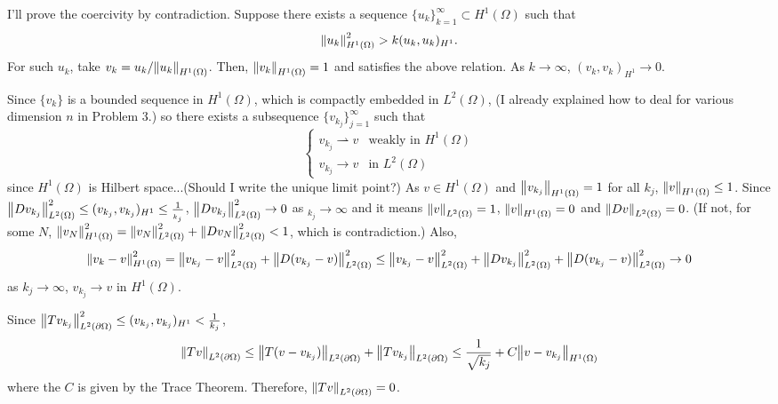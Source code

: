 \documentclass{article}
\begin{document}
\begin{enumerate}
\begin{enumerate}
I'll prove the coercivity by contradiction. Suppose there exists a sequence $\{u_k\}_{k=1}^\infty\subset H^1(\Omega)$ such that
\begin{equation*}
\norm{u_k}^2_{H^1(\Omega)}> k(u_k,u_k)_{H^1}.
\end{equation*}
For such $u_k$, take $v_k=u_k/\norm{u_k}_{H^1(\Omega)}$. Then, $\norm{v_k}_{H^1(\Omega)}=1$ and satisfies the above relation. As $k\rightarrow \infty$, $(v_k,v_k)_{H^1}\rightarrow 0$.

Since $\{v_k\}$ is a bounded sequence in $H^1(\Omega)$, which is compactly embedded in $L^2(\Omega)$, (I already explained how to deal for various dimension $n$ in Problem 3.) so there exists a subsequence $\{v_{k_j}\}_{j=1}^\infty$ such that 
\begin{equation*}
\begin{cases}
v_{k_j}\rightharpoonup v & \text{weakly in }H^1(\Omega) \\
v_{k_j}\rightarrow v & \text{in }L^2(\Omega)
\end{cases}
\end{equation*}
since $H^1(\Omega)$ is Hilbert space...(Should I write the unique limit point?) As $v\in H^1(\Omega)$ and $\norm{v_{k_j}}_{H^1(\Omega)}=1$ for all $k_j$, $\norm{v}_{H^1(\Omega)}\leq 1$. Since $\norm{Dv_{k_j}}^2_{L^2(\Omega)}\leq (v_{k_j},v_{k_j})_{H^1}\leq \frac{1}{_{k_j}}$, $\norm{Dv_{k_j}}^2_{L^2(\Omega)}\rightarrow 0$ as $_{k_j}\rightarrow \infty$ and it means $\norm{v}_{L^2(\Omega)}=1$, $\norm{v}_{H^1(\Omega)}=0$ and $\norm{Dv}_{L^2(\Omega)}=0$. (If not, for some $N$, $\norm{v_N}^2_{H^1(\Omega)}=\norm{v_N}^2_{L^2(\Omega)}+\norm{Dv_N}^2_{L^2(\Omega)}<1$, which is contradiction.) Also,
\begin{equation*}
\norm{v_k-v}^2_{H^1(\Omega)}=\norm{v_{k_j}-v}^2_{L^2(\Omega)}+\norm{D(v_{k_j}-v)}^2_{L^2(\Omega)}\leq \norm{v_{k_j}-v}^2_{L^2(\Omega)}+\norm{Dv_{k_j}}^2_{L^2(\Omega)}+\norm{D(v_{k_j}-v)}^2_{L^2(\Omega)}\rightarrow 0
\end{equation*}
as ${k_j}\rightarrow \infty$, $v_{k_j}\rightarrow v$ in $H^1(\Omega)$.

Since $\norm{Tv_{k_j}}^2_{L^2(\partial \Omega)}\leq (v_{k_j},v_{k_j})_{H^1}<\frac{1}{k_j}$,
\begin{equation*}
\norm{Tv}_{L^2(\partial \Omega)}\leq \norm{T(v-v_{k_j})}_{L^2(\partial \Omega)}+\norm{Tv_{k_j}}_{L^2(\partial \Omega)}\leq \frac{1}{\sqrt{k_j}}+C\norm{v-v_{k_j}}_{H^1(\Omega)}
\end{equation*}
where the $C$ is given by the Trace Theorem. Therefore, $\norm{Tv}_{L^2(\partial \Omega)}=0$.


\end{enumerate}
\end{enumerate}
\end{document}
